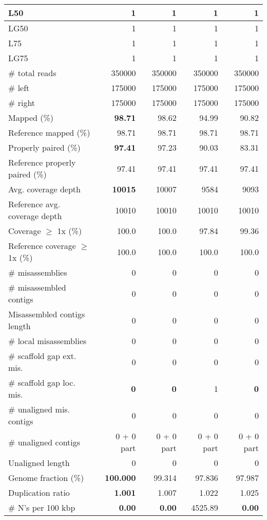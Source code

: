 \documentclass[12pt,a4paper]{article}
\begin{document}
\begin{table}[ht]
\begin{center}
\begin{tabular}{|l*{4}{|r}|}
L50 & 1 & 1 & 1 & 1 \\ \hline
LG50 & 1 & 1 & 1 & 1 \\ \hline
L75 & 1 & 1 & 1 & 1 \\ \hline
LG75 & 1 & 1 & 1 & 1 \\ \hline
\# total reads & 350000 & 350000 & 350000 & 350000 \\ \hline
\# left & 175000 & 175000 & 175000 & 175000 \\ \hline
\# right & 175000 & 175000 & 175000 & 175000 \\ \hline
Mapped (\%) & {\bf 98.71} & 98.62 & 94.99 & 90.82 \\ \hline
Reference mapped (\%) & 98.71 & 98.71 & 98.71 & 98.71 \\ \hline
Properly paired (\%) & {\bf 97.41} & 97.23 & 90.03 & 83.31 \\ \hline
Reference properly paired (\%) & 97.41 & 97.41 & 97.41 & 97.41 \\ \hline
Avg. coverage depth & {\bf 10015} & 10007 & 9584 & 9093 \\ \hline
Reference avg. coverage depth & 10010 & 10010 & 10010 & 10010 \\ \hline
Coverage $\geq$ 1x (\%) & 100.0 & 100.0 & 97.84 & 99.36 \\ \hline
Reference coverage $\geq$ 1x (\%) & 100.0 & 100.0 & 100.0 & 100.0 \\ \hline
\# misassemblies & 0 & 0 & 0 & 0 \\ \hline
\# misassembled contigs & 0 & 0 & 0 & 0 \\ \hline
Misassembled contigs length & 0 & 0 & 0 & 0 \\ \hline
\# local misassemblies & 0 & 0 & 0 & 0 \\ \hline
\# scaffold gap ext. mis. & 0 & 0 & 0 & 0 \\ \hline
\# scaffold gap loc. mis. & {\bf 0} & {\bf 0} & 1 & {\bf 0} \\ \hline
\# unaligned mis. contigs & 0 & 0 & 0 & 0 \\ \hline
\# unaligned contigs & 0 + 0 part & 0 + 0 part & 0 + 0 part & 0 + 0 part \\ \hline
Unaligned length & 0 & 0 & 0 & 0 \\ \hline
Genome fraction (\%) & {\bf 100.000} & 99.314 & 97.836 & 97.987 \\ \hline
Duplication ratio & {\bf 1.001} & 1.007 & 1.022 & 1.025 \\ \hline
\# N's per 100 kbp & {\bf 0.00} & {\bf 0.00} & 4525.89 & {\bf 0.00} \\ \hline

\end{tabular}
\end{center}
\end{table}
\end{document}
